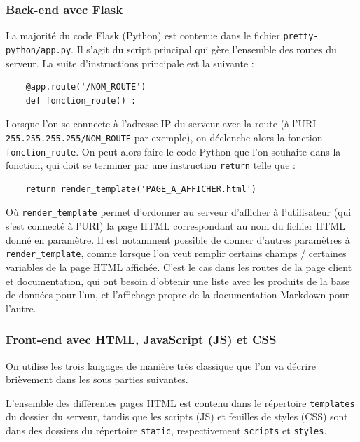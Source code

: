 \documentclass[a4paper,12pt]{report}  %
\begin{document}
\subsubsection{Back-end avec Flask}

La majorité du code Flask (Python) est contenue dans le fichier \texttt{pretty-python/app.py}. Il s’agit du script principal qui gère l’ensemble des routes du serveur. 
La suite d’instructions principale est la suivante : 

\begin{lstlisting}
	@app.route('/NOM_ROUTE')
	def fonction_route() :
\end{lstlisting}

Lorsque l’on se connecte à l’adresse IP du serveur avec la route (à l’URI \texttt{255.255.255.255/NOM\_ROUTE} par exemple), on déclenche alors la fonction \texttt{fonction\_route}.
On peut alors faire le code Python que l’on souhaite dans la fonction, qui doit se terminer par une instruction \texttt{return} telle que :

\begin{lstlisting}
	return render_template('PAGE_A_AFFICHER.html')
\end{lstlisting}

Où \texttt{render\_template} permet d’ordonner au serveur d’afficher à l’utilisateur (qui s’est connecté à l’URI) la page HTML correspondant au nom du fichier HTML donné en paramètre. Il est notamment possible de donner d’autres paramètres à \texttt{render\_template}, comme lorsque l’on veut remplir certains champs / certaines variables de la page HTML affichée. C’est le cas dans les routes de la page client et documentation, qui ont besoin d’obtenir une liste avec les produits de la base de données pour l’un, et l’affichage propre de la documentation Markdown pour l’autre.

\subsubsection{Front-end avec HTML, JavaScript (JS) et CSS}

On utilise les trois langages de manière très classique que l’on va décrire brièvement dans les sous parties suivantes.

L’ensemble des différentes pages HTML est contenu dans le répertoire \texttt{templates} du dossier du serveur, tandis que les scripts (JS) et feuilles de styles (CSS) sont dans des dossiers du répertoire \texttt{static}, respectivement \texttt{scripts} et \texttt{styles}.
\end{document}
